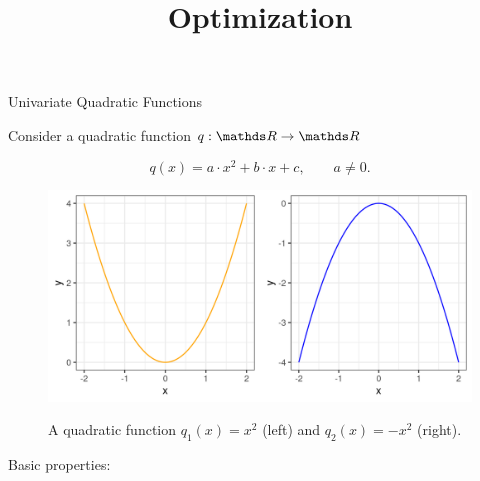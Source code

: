 \documentclass[11pt,compress,t,notes=noshow, xcolor=table]{beamer}
\title{Optimization}
\date{}
\begin{document}
\sloppy

\begin{vbframe}{Univariate Quadratic Functions}

  Consider a quadratic function $q: \R \to \R$
  
  $$
    q(x) = a \cdot x^2 + b \cdot x + c, \qquad a \ne 0.
  $$
  
  
  \begin{figure}
    \includegraphics[height=0.3\textwidth, keepaspectratio]{figure_man/quadratic_functions_1D.png} \\
    \begin{footnotesize} 
    A quadratic function $q_1(x) = x^2$ (left) and $q_2(x) = - x^2$ (right). 
    \end{footnotesize}
  \end{figure}
  
  \framebreak 
  
  Basic properties: 
  

\end{vbframe}
\end{document}
